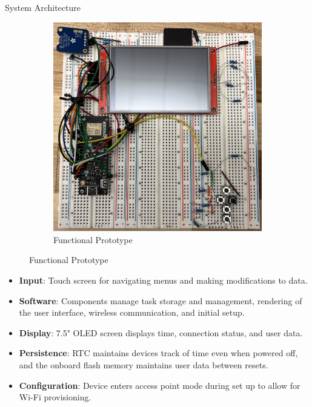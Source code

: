 \documentclass[final]{beamer}
\newlength{\colwidth}
\begin{document}
\begin{frame}[t]
\begin{columns}[t]
\begin{column}{\colwidth}
\begin{block}{System Architecture}
\begin{figure}
\begin{subfigure}[t]{0.44\textwidth}
              \includegraphics[width=\textwidth]{prototype.jpg}
              \caption{Functional Prototype}
          \end{subfigure}
        \end{figure}

        \begin{itemize}
          \item \textbf{Input}: Touch screen for navigating menus and
            making modifications to data.
          \item \textbf{Software}: Components manage task storage and
            management, rendering of the user interface, wireless
            communication, and initial setup.
          \item \textbf{Display}: 7.5" OLED screen displays time, connection status,
            and user data.
          \item \textbf{Persistence}: RTC maintains devices track of time even 
            when powered off, and the onboard flash memory maintains user data
            between resets.
          \item \textbf{Configuration}: Device enters access point mode during set up to allow for Wi-Fi provisioning.
        \end{itemize}

      \end{block}


\end{column}
\end{columns}
\end{frame}
\end{document}
